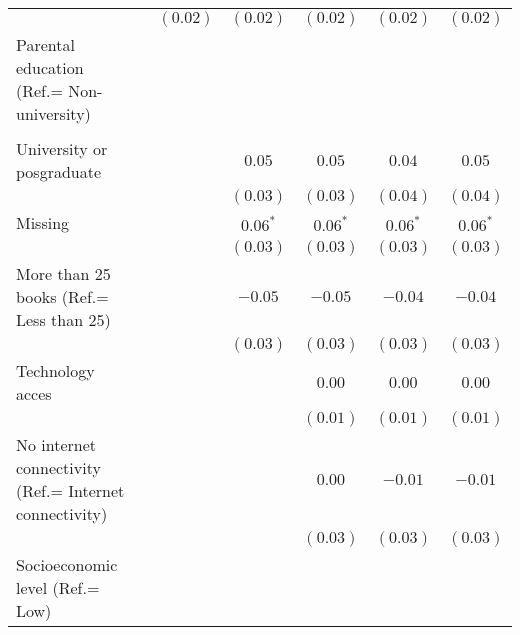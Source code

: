 \documentclass[
  12pt,
  letterpaper,
]{article}
\begin{document}
\begin{table}
{\begin{center}
{\begin{threeparttable}
\begin{tabular}{l c c c c c c}
                                                       &              & $(0.02)$      & $(0.02)$      & $(0.02)$      & $(0.02)$      & $(0.02)$      \\
Parental education (Ref.= Non-university)              &              &               &               &               &               &               \\
                                                       &              &               &               &               &               &               \\
\quad University or posgraduate                        &              &               & $0.05$        & $0.05$        & $0.04$        & $0.05$        \\
                                                       &              &               & $(0.03)$      & $(0.03)$      & $(0.04)$      & $(0.04)$      \\
\quad Missing                                          &              &               & $0.06^{*}$    & $0.06^{*}$    & $0.06^{*}$    & $0.06^{*}$    \\
                                                       &              &               & $(0.03)$      & $(0.03)$      & $(0.03)$      & $(0.03)$      \\
More than 25 books (Ref.= Less than 25)                &              &               & $-0.05$       & $-0.05$       & $-0.04$       & $-0.04$       \\
                                                       &              &               & $(0.03)$      & $(0.03)$      & $(0.03)$      & $(0.03)$      \\
Technology acces                                       &              &               &               & $0.00$        & $0.00$        & $0.00$        \\
                                                       &              &               &               & $(0.01)$      & $(0.01)$      & $(0.01)$      \\
No internet connectivity (Ref.= Internet connectivity) &              &               &               & $0.00$        & $-0.01$       & $-0.01$       \\
                                                       &              &               &               & $(0.03)$      & $(0.03)$      & $(0.03)$      \\
Socioeconomic level (Ref.= Low)                        &              &               &               &               &               &               \\

\end{tabular}
\end{threeparttable}}
\end{center}}
\end{table}
\end{document}
